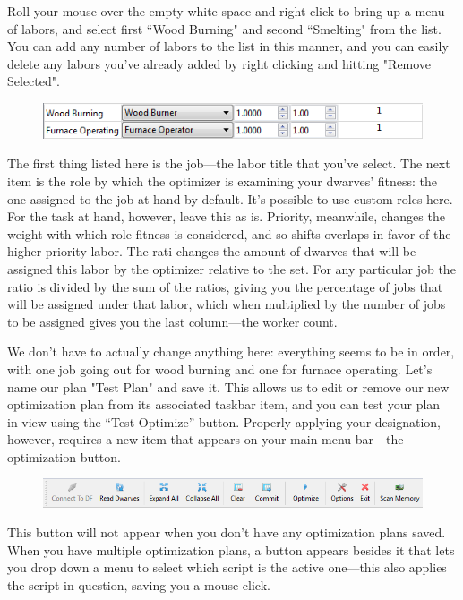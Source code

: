 \documentclass[]{article}
\begin{document}
Roll your mouse over the empty white space and right click to bring up a menu of labors, and select first
``Wood Burning" and second ``Smelting" from the list. You can add any number of labors to the list in
this manner, and you can easily delete any labors you've already added by right clicking and hitting
"Remove Selected".

\begin{figure}[h!]
\centering
\includegraphics[scale=1]{Sec4Fig7}
\end{figure}

The first thing listed here is the job---the labor title that you've select. The next item is the role by
which the optimizer is examining your dwarves' fitness: the one assigned to the job at hand by default.
It's possible to use custom roles here. For the task at hand, however, leave this as is. Priority,
meanwhile, changes the weight with which role fitness is considered, and so shifts overlaps in favor of
the higher-priority labor. The rati changes the amount of dwarves that will be
assigned this labor by the optimizer relative to the set. For any particular job the ratio is
divided by the sum of the ratios, giving you the percentage of jobs that will be assigned under that
labor, which when multiplied by the number of jobs to be assigned gives you the last column---the worker
count.

We don't have to actually change anything here: everything seems to be in order, with one job going out
for wood burning and one for furnace operating. Let's name our plan "Test Plan" and save it. This allows
us to edit or remove our new optimization plan from its associated taskbar item, and you can test your
plan in-view using the ``Test Optimize'' button. Properly applying your designation, however,
requires a new item that appears on your main menu bar---the optimization button.

\begin{figure}[h!] \centering \includegraphics[width=\linewidth]{Sec4Fig8}
\end{figure}

This button will not appear when you don't have any optimization plans saved. When you have multiple
optimization plans, a button appears besides it that lets you drop down a menu to select which script is
the active one---this also applies the script in question, saving you a mouse click.
\end{document}
